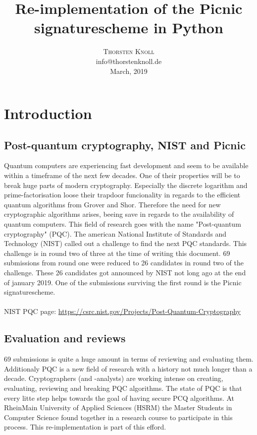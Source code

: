 \documentclass[]{article}
\title{\vspace{-7mm}%
	\fontsize{24pt}{10pt}\selectfont
	\textbf{Re-implementation of the Picnic signaturescheme in Python}
	}
\author{%
	\large
	\textsc{Thorsten Knoll} \\[2mm]
	\normalsize	info@thorstenknoll.de \\[2mm]
	\normalsize March, 2019
	}
\date{}
\begin{document}
\maketitle
\thispagestyle{fancy}


\section{Introduction}
\subsection{Post-quantum cryptography, NIST and Picnic}
Quantum computers are experiencing fast development and seem to be available within a timeframe of the next few decades. One of their properties will be to break huge parts of modern cryptography. Especially the discrete logarithm and prime-factorisation loose their trapdoor funcionality in regards to the efficient quantum algorithms from Grover and Shor. Therefore the need for new cryptographic algorithms arises, beeing save in regards to the availability of quantum computers. This field of research goes with the name "Post-quantum cryptography" (PQC). The american National Institute of Standards and Technology (NIST) called out a challenge to find the next PQC standards. This challenge is in round two of three at the time of writing this document. 69 submissions from round one were reduced to 26 candidates in round two of the challenge. These 26 candidates got announced by NIST not long ago at the end of january 2019. One of the submissions surviving the first round is the Picnic signaturescheme.\\ \\
NIST PQC page: \url{https://csrc.nist.gov/Projects/Post-Quantum-Cryptography} 
\subsection{Evaluation and reviews}
69 submissions is quite a huge amount in terms of reviewing and evaluating them. Additionaly PQC is a new field of research with a history not much longer than a decade. Cryptographers (and -analysts) are working intense on creating, evaluating, reviewing and breaking PQC algorithms. The state of PQC is that every litte step helps towards the goal of having secure PCQ algorithms. At RheinMain University of Applied Sciences (HSRM) the Master Students in Computer Science found together in a research course to participate in this process. This re-implementation is part of this efford.
\end{document}
